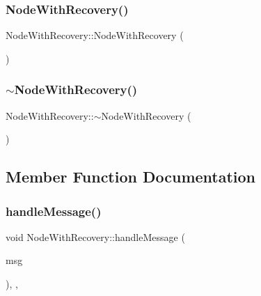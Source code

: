 \subsubsection{\texorpdfstring{Node\+With\+Recovery()}{NodeWithRecovery()}}
{\footnotesize\ttfamily Node\+With\+Recovery\+::\+Node\+With\+Recovery (\begin{DoxyParamCaption}{ }\end{DoxyParamCaption})}

\mbox{\label{class_node_with_recovery_a5cb1367a800cf960b96c9011ab94a616}} 
\subsubsection{\texorpdfstring{$\sim$\+Node\+With\+Recovery()}{~NodeWithRecovery()}}
{\footnotesize\ttfamily Node\+With\+Recovery\+::$\sim$\+Node\+With\+Recovery (\begin{DoxyParamCaption}{ }\end{DoxyParamCaption})\hspace{0.3cm}{\ttfamily [virtual]}}



\subsection{Member Function Documentation}
\mbox{\label{class_node_with_recovery_a901c89606b84898e13fe8a66228acd9f}} 
\subsubsection{\texorpdfstring{handle\+Message()}{handleMessage()}}
{\footnotesize\ttfamily void Node\+With\+Recovery\+::handle\+Message (\begin{DoxyParamCaption}\item[{c\+Message $\ast$}]{msg }\end{DoxyParamCaption})\hspace{0.3cm}{\ttfamily [override]}, {\ttfamily [protected]}, {\ttfamily [virtual]}}



